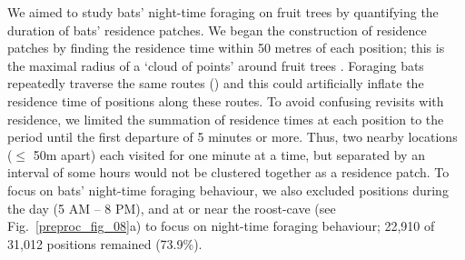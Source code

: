    We aimed to study bats' night-time foraging on fruit trees by quantifying the duration of bats' residence patches.
    We began the construction of residence patches by finding the residence time within 50 metres of each position; this is the maximal radius of a `cloud of points' around fruit trees \citep{bracis2018}.
    Foraging bats repeatedly traverse the same routes (\citealt{toledo2020, tsoar2011, lourie2021}) and this could artificially inflate the residence time of positions along these routes.
    To avoid confusing revisits with residence, we limited the summation of residence times at each position to the period until the first departure of 5 minutes or more.
    Thus, two nearby locations ($\leq$ 50m apart) each visited for one minute at a time, but separated by an interval of some hours would not be clustered together as a residence patch. 
    To focus on bats' night-time foraging behaviour, we also excluded positions during the day (5 AM -- 8 PM), and at or near the roost-cave (see Fig.~\ref{preproc_fig_08}a) to focus on night-time foraging behaviour; 22,910 of 31,012 positions remained (73.9\%).
    
